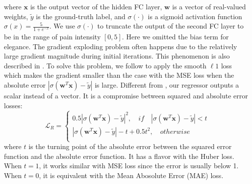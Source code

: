 \documentclass{article}
\begin{document}
\noindent where $\mathbf{x}$ is the output vector of the hidden FC layer, $\mathbf{w}$ is a vector of real-valued weights, $\tilde{y}$ is the ground-truth label, and
$\sigma(\cdot)$ is a sigmoid activation function $\sigma (x) = \frac{5}{1+e^{-x}}$.
We use $\sigma(\cdot)$ to truncate the output of the second FC layer to be in the range of pain intensity $[0, 5]$.
Here we omitted the bias term for elegance.
The gradient exploding problem often happens due to the relatively large gradient magnitude during initial iterations. 
This phenomenon is also described in \cite{girshick2015fast}. 
To solve this problem, we follow \cite{girshick2015fast} to apply the smooth $\ell 1$ loss 
which makes the gradient smaller than the case with the MSE loss 
when the absolute error $|\sigma(\mathbf{w}^T \mathbf{x}) - \tilde{y}|$ is large.
Different from \cite{girshick2015fast}, our regressor outputs a scalar instead of a vector. 
It is a compromise between squared and absolute error losses:
\begin{equation}
    \mathcal{L}_R = \left\{
                \begin{array}{ll}
                  0.5 |\sigma(\mathbf{w}^T \mathbf{x}) - \tilde{y}|^2, \quad if \quad |\sigma(\mathbf{w}^T \mathbf{x}) - \tilde{y}| < t\\
                  |\sigma(\mathbf{w}^T \mathbf{x}) - \tilde{y}|- t + 0.5 t^2, \quad otherwise\\
                \end{array}
              \right.
\label{eq:smoothl1}
\end{equation}
where $t$ is the turning point of the absolute error between the squared error function and the absolute error function. It has a flavor with the Huber loss. When $t=1$, it works similar with MSE loss since the error is usually below 1. When $t=0$, it is equivalent with the Mean Abosolute Error (MAE) loss. %
\end{document}
